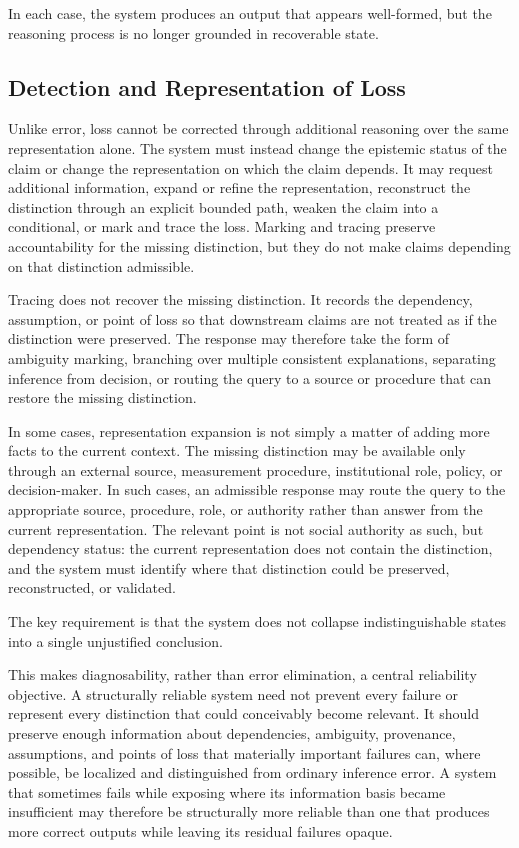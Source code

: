 \documentclass[11pt]{article}
\theoremstyle{definition}
\theoremstyle{remark}
\begin{document}
In each case, the system produces an output that appears well-formed, but the reasoning process is no longer grounded in recoverable state.

\subsection{Detection and Representation of Loss}

Unlike error, loss cannot be corrected through additional reasoning over the same representation alone. The system must instead change the epistemic status of the claim or change the representation on which the claim depends. It may request additional information, expand or refine the representation, reconstruct the distinction through an explicit bounded path, weaken the claim into a conditional, or mark and trace the loss. Marking and tracing preserve accountability for the missing distinction, but they do not make claims depending on that distinction admissible.

Tracing does not recover the missing distinction. It records the dependency, assumption, or point of loss so that downstream claims are not treated as if the distinction were preserved. The response may therefore take the form of ambiguity marking, branching over multiple consistent explanations, separating inference from decision, or routing the query to a source or procedure that can restore the missing distinction.

In some cases, representation expansion is not simply a matter of adding more facts to the current context. The missing distinction may be available only through an external source, measurement procedure, institutional role, policy, or decision-maker. In such cases, an admissible response may route the query to the appropriate source, procedure, role, or authority rather than answer from the current representation. The relevant point is not social authority as such, but dependency status: the current representation does not contain the distinction, and the system must identify where that distinction could be preserved, reconstructed, or validated.

The key requirement is that the system does not collapse indistinguishable states into a single unjustified conclusion.

This makes diagnosability, rather than error elimination, a central reliability objective. A structurally reliable system need not prevent every failure or represent every distinction that could conceivably become relevant. It should preserve enough information about dependencies, ambiguity, provenance, assumptions, and points of loss that materially important failures can, where possible, be localized and distinguished from ordinary inference error. A system that sometimes fails while exposing where its information basis became insufficient may therefore be structurally more reliable than one that produces more correct outputs while leaving its residual failures opaque.
\end{document}
